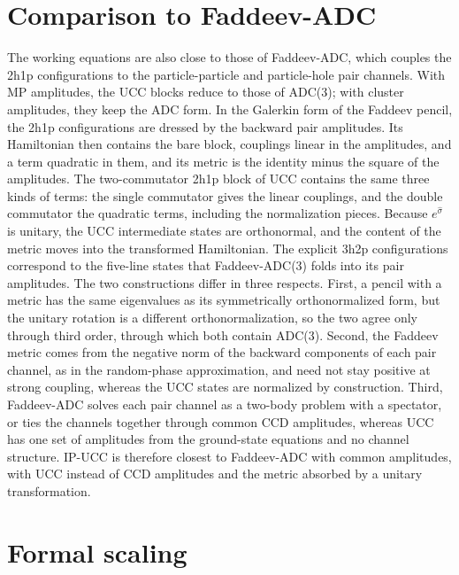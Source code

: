 \documentclass[aip,jcp,reprint,noshowkeys,superscriptaddress]{revtex4-2}
\newcommand{\hs}{\hat{\sigma}}
\begin{document}
\section{Comparison to Faddeev-ADC}

The working equations are also close to those of Faddeev-ADC, which couples the 2h1p configurations to the particle-particle and particle-hole pair channels.\cite{Barbieri_2001,Barbieri_2007}
With MP amplitudes, the UCC blocks reduce to those of ADC(3);\cite{Liu_2018} with cluster amplitudes, they keep the ADC form.
In the Galerkin form of the Faddeev pencil, the 2h1p configurations are dressed by the backward pair amplitudes.
Its Hamiltonian then contains the bare block, couplings linear in the amplitudes, and a term quadratic in them, and its metric is the identity minus the square of the amplitudes.
The two-commutator 2h1p block of UCC contains the same three kinds of terms: the single commutator gives the linear couplings, and the double commutator the quadratic terms, including the normalization pieces.
Because $e^{\hs}$ is unitary, the UCC intermediate states are orthonormal, and the content of the metric moves into the transformed Hamiltonian.
The explicit 3h2p configurations correspond to the five-line states that Faddeev-ADC(3) folds into its pair amplitudes.
The two constructions differ in three respects.
First, a pencil with a metric has the same eigenvalues as its symmetrically orthonormalized form, but the unitary rotation is a different orthonormalization, so the two agree only through third order, through which both contain ADC(3).
Second, the Faddeev metric comes from the negative norm of the backward components of each pair channel, as in the random-phase approximation, and need not stay positive at strong coupling, whereas the UCC states are normalized by construction.
Third, Faddeev-ADC solves each pair channel as a two-body problem with a spectator, or ties the channels together through common CCD amplitudes, whereas UCC has one set of amplitudes from the ground-state equations and no channel structure.
IP-UCC is therefore closest to Faddeev-ADC with common amplitudes, with UCC instead of CCD amplitudes and the metric absorbed by a unitary transformation.

\section{Formal scaling}
\end{document}
